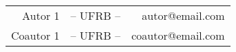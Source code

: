 \documentclass{ematUFRB}
\begin{document}
%
  \titulo
%
  \autores
  {
    \begin{tabular}{rrr}
        Autor 1 &-- UFRB -- &   autor@email.com \\
      Coautor 1 &-- UFRB -- & coautor@email.com 
    \end{tabular}
  }
%
  \onehalfspacing
%
%
  
  
  
%
%
  \nocite{*}
  \printbibliography
%
\end{document}
